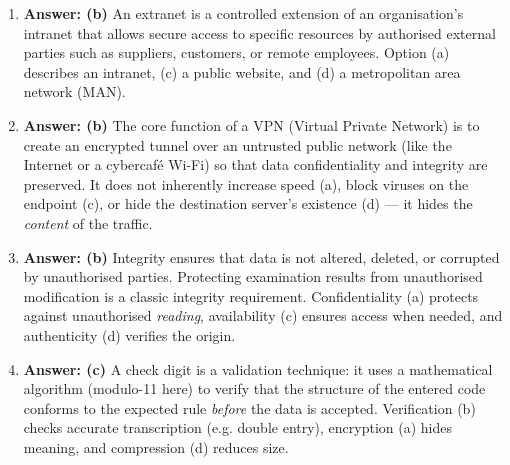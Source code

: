 \documentclass[11pt]{article}
\newcommand{\cle}[1]{{\popxbold\color{popdark}#1}}
\begin{document}
\begin{corrige}
\begin{enumerate}
\item \textbf{Answer: (b)} An \cle{extranet} is a controlled extension of an organisation's \cle{intranet} that allows secure access to specific resources by authorised external parties such as suppliers, customers, or remote employees. Option (a) describes an intranet, (c) a public website, and (d) a metropolitan area network (MAN).
\item \textbf{Answer: (b)} The core function of a \cle{VPN} (Virtual Private Network) is to create an encrypted tunnel over an untrusted public network (like the Internet or a cybercafé Wi-Fi) so that data \cle{confidentiality} and \cle{integrity} are preserved. It does not inherently increase speed (a), block viruses on the endpoint (c), or hide the destination server's existence (d) — it hides the \emph{content} of the traffic.
\item \textbf{Answer: (b)} \cle{Integrity} ensures that data is not altered, deleted, or corrupted by unauthorised parties. Protecting examination results from unauthorised modification is a classic integrity requirement. \cle{Confidentiality} (a) protects against unauthorised \emph{reading}, \cle{availability} (c) ensures access when needed, and \cle{authenticity} (d) verifies the origin.
\item \textbf{Answer: (c)} A \cle{check digit} is a \cle{validation} technique: it uses a mathematical algorithm (modulo-11 here) to verify that the structure of the entered code conforms to the expected rule \emph{before} the data is accepted. \cle{Verification} (b) checks accurate transcription (e.g. double entry), \cle{encryption} (a) hides meaning, and \cle{compression} (d) reduces size.
\end{enumerate}
\end{corrige}
\end{document}
